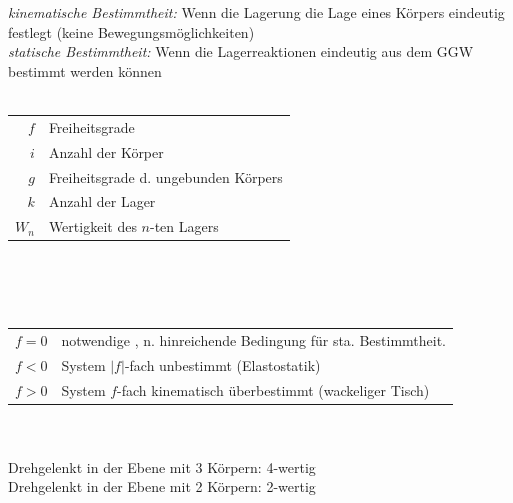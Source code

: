 \documentclass[fs, footer]{latex4ei}
\begin{document}
\begin{multicols}{4}
\begin{tabular}{rl}
	\end{tabular}	\\ \\
	\emph{kinematische Bestimmtheit: }  Wenn die Lagerung die Lage eines Körpers eindeutig festlegt (keine Bewegungsmöglichkeiten)\\
	\emph{statische Bestimmtheit: } Wenn die Lagerreaktionen eindeutig aus dem GGW bestimmt werden können\\ \\ 
	\parbox{4.6cm}{
	\begin{tabular}{rl}
	$f$ &  Freiheitsgrade \\
	$i$ & Anzahl der Körper \\
	$g$ & Freiheitsgrade d. ungebunden Körpers \\
	$k$ & Anzahl der Lager \\
	$W_n$ &  Wertigkeit des $n$-ten Lagers\\
	\end{tabular} }	
	\parbox{2.0cm}{}
$\;$ \\ \\  \\ 
	\begin{tabular}{ll}
		$f=0$ & notwendige ,  n. hinreichende Bedingung für sta. Bestimmtheit.\\
		$f<0$ & System $|f|$-fach unbestimmt (Elastostatik)\\
		$f>0$ & System $f$-fach kinematisch überbestimmt (wackeliger Tisch)\\
	\end{tabular} \\ \\
	Drehgelenkt in der Ebene mit 3 Körpern: 4-wertig\\
	Drehgelenkt in der Ebene mit 2 Körpern: 2-wertig\\
	
	

\end{multicols}
\end{document}
